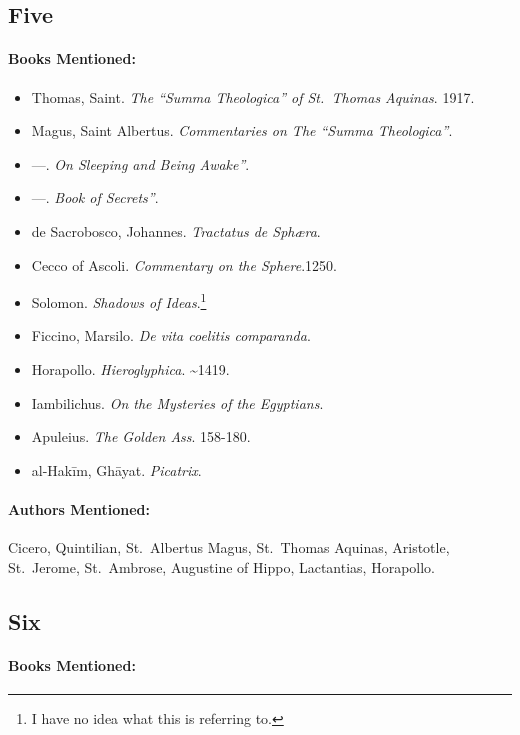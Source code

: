 \documentclass[12pt]{article}
\providecommand{\tightlist}{%
  \setlength{\itemsep}{0pt}\setlength{\parskip}{0pt}}
\begin{document}
\subsection{Five}\label{five-2}

\paragraph{Books Mentioned:}\label{books-mentioned-19}

\begin{itemize}
\tightlist
\item
  Thomas, Saint. \emph{The ``Summa Theologica'' of St.~Thomas Aquinas}. 1917.
\item
  Magus, Saint Albertus. \emph{Commentaries on The ``Summa Theologica''}.
\item
  ---. \emph{On Sleeping and Being Awake''}.
\item
  ---. \emph{Book of Secrets''}.
\item
  de Sacrobosco, Johannes. \emph{Tractatus de Sphæra}.
\item
  Cecco of Ascoli. \emph{Commentary on the Sphere}.1250.
\item
  Solomon. \emph{Shadows of Ideas}.\footnote{I have no idea what this is referring to.}
\item
  Ficcino, Marsilo. \emph{De vita coelitis comparanda}.
\item
  Horapollo. \emph{Hieroglyphica}. \textasciitilde1419.
\item
  Iambilichus. \emph{On the Mysteries of the Egyptians}.
\item
  Apuleius. \emph{The Golden Ass}. 158-180.
\item
  al-Hakīm, Ghāyat. \emph{Picatrix}.
\end{itemize}

\paragraph{Authors Mentioned:}\label{authors-mentioned-14}

Cicero, Quintilian, St.~Albertus Magus, St.~Thomas Aquinas, Aristotle, St.~Jerome, St.~Ambrose, Augustine of Hippo, Lactantias, Horapollo.

\subsection{Six}\label{six-2}

\paragraph{Books Mentioned:}\label{books-mentioned-20}
\end{document}
